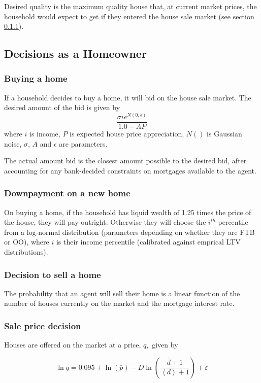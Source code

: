 \documentclass{article}
\begin{document}
Desired quality is the maximum quality house that, at current market prices, the household would expect to get if they entered the house sale market (see section \ref{buyahome}).

\subsection{Decisions as a Homeowner}

\subsubsection{Buying a home}
\label{buyahome}
If a household decides to buy a home, it will bid on the house sale market. The desired amount of the bid is given by
\[
 \frac{\sigma i e^{N(0,\epsilon)}}{1.0 - AP}
\]
where $i$ is income, $P$ is expected house price appreciation, $N()$ is Gaussian noise, $\sigma$, $A$ and $\epsilon$ are parameters.

The actual amount bid is the closest amount possible to the desired bid, after accounting for any bank-decided constraints on mortgages available to the agent.

\subsubsection{Downpayment on a new home}
On buying a home, if the household has liquid wealth of 1.25 times the price of the house, they will pay outright. Otherwise they will choose the $i^{th}$ percentile from a log-normal distribution (parameters depending on whether they are FTB or OO), where $i$ is their income percentile (calibrated against emprical LTV distributions).

\subsubsection{Decision to sell a home}
The probability that an agent will sell their home is a linear function of the number of houses currently on the market and the mortgage interest rate.

\subsubsection{Sale price decision}
Houses are offered on the market at a price, $q,$ given by

\begin{equation}
\ln q=0.095+\ln (\bar{p})-D\ln \left( \frac{\bar{d}+1}{\left\langle
d\right\rangle +1}\right) +\varepsilon
\end{equation}
\end{document}
